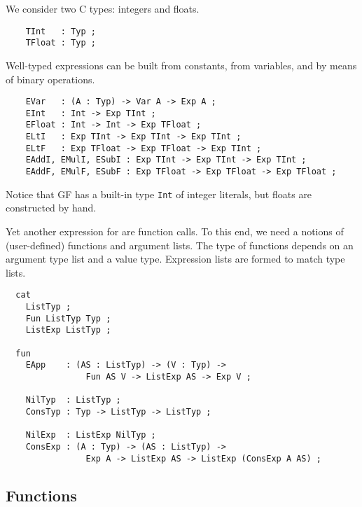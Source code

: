 \documentclass[12pt]{article}
\begin{document}
We consider two C types: integers and floats.
\begin{verbatim}
    TInt   : Typ ;
    TFloat : Typ ;
\end{verbatim}
Well-typed expressions can be built from constants,
from variables, and by means of binary operations.
\begin{verbatim}
    EVar   : (A : Typ) -> Var A -> Exp A ;
    EInt   : Int -> Exp TInt ;
    EFloat : Int -> Int -> Exp TFloat ;
    ELtI   : Exp TInt -> Exp TInt -> Exp TInt ;
    ELtF   : Exp TFloat -> Exp TFloat -> Exp TInt ;
    EAddI, EMulI, ESubI : Exp TInt -> Exp TInt -> Exp TInt ;
    EAddF, EMulF, ESubF : Exp TFloat -> Exp TFloat -> Exp TFloat ;
\end{verbatim}
Notice that GF has a built-in type \texttt{Int} of
integer literals, but floats are constructed by hand.

Yet another expression for are function calls. To this
end, we need a notions of (user-defined) functions and
argument lists. The type of functions depends on an
argument type list and a value type. Expression lists
are formed to match type lists.
\begin{verbatim}
  cat
    ListTyp ;
    Fun ListTyp Typ ;
    ListExp ListTyp ;

  fun
    EApp    : (AS : ListTyp) -> (V : Typ) -> 
                Fun AS V -> ListExp AS -> Exp V ;

    NilTyp  : ListTyp ;
    ConsTyp : Typ -> ListTyp -> ListTyp ;

    NilExp  : ListExp NilTyp ;
    ConsExp : (A : Typ) -> (AS : ListTyp) -> 
                Exp A -> ListExp AS -> ListExp (ConsExp A AS) ;
\end{verbatim}



\subsection{Functions}
\end{document}
